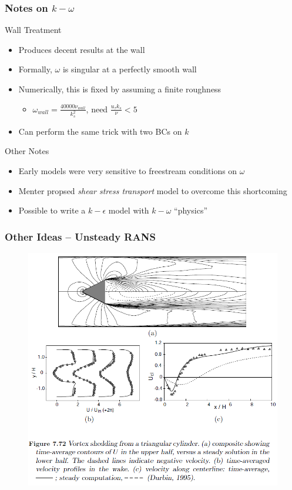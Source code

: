 \documentclass{beamer}
\begin{document}
\begin{frame}\frametitle{Notes on $k-\omega$}
\begin{block}{Wall Treatment}
\begin{itemize}
	\item Produces decent results at the wall
	\item Formally, $\omega$ is singular at a perfectly smooth wall
	\item Numerically, this is fixed by assuming a finite roughness
	\begin{itemize}
		\item $\omega_{wall}=\frac{40000\nu_{wall}}{k_s^2}$, need $\frac{u_\tau k_s}{\nu}<5$
	\end{itemize}
	\item Can perform the same trick with two BCs on $k$
\end{itemize}
\end{block}

\begin{block}{Other Notes}
\begin{itemize}
	\item Early models were very sensitive to freestream conditions on $\omega$
	\item Menter propsed \emph{shear stress transport} model to overcome this shortcoming
	\item Possible to write a $k-\epsilon$ model with $k-\omega$ ``physics''
\end{itemize}
\end{block}
\end{frame}

\begin{frame}\frametitle{Other Ideas -- Unsteady RANS}
\begin{figure}[t]
	\begin{center}
		\includegraphics[height=0.9\textheight]{URANS.png}
	\end{center}
\end{figure}
\end{frame}
\end{document}
